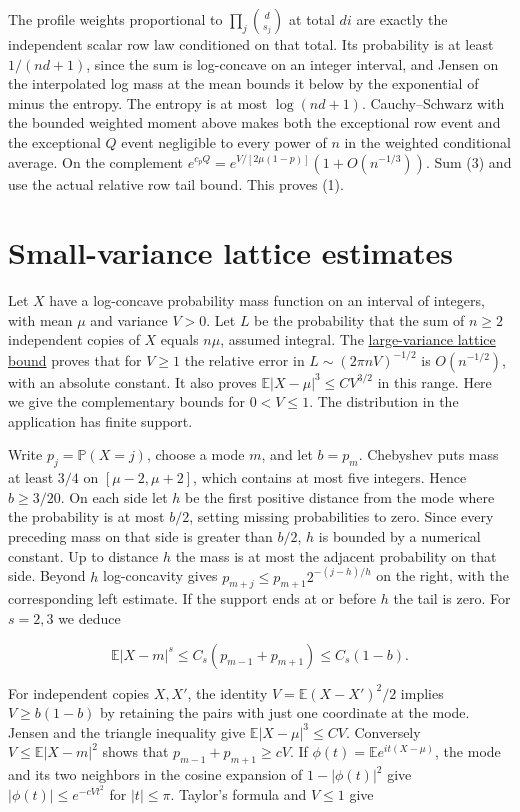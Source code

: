 \documentclass[11pt]{article}
\begin{document}
The profile weights proportional to $\prod_j\binom d{s_j}$ at total
$di$ are exactly the independent scalar row law conditioned on that
total. Its probability is at least $1/(nd+1)$, since the sum is
log-concave on an integer interval, and Jensen on the interpolated
log mass at the mean bounds it below by the exponential of minus
the entropy. The entropy is at most $\log(nd+1)$. Cauchy--Schwarz with
the bounded weighted moment above makes both the exceptional row
event and the exceptional $Q$ event negligible to every power of
$n$ in the weighted conditional average. On the complement
$e^{c_p Q}=e^{V/[2\mu(1-p)]}(1+O(n^{-1/3}))$. Sum (3) and use
the actual relative row tail bound. This proves (1).

\section{Small-variance lattice estimates}
\label{app:small-var}

Let $X$ have a log-concave probability mass function on an interval of integers, with mean $\mu$ and variance $V>0$. Let $L$ be the probability that the sum of $n\ge2$ independent copies of $X$ equals $n\mu$, assumed integral. The \hyperref[app:large-var]{large-variance lattice bound} proves that for $V\ge1$ the relative error in $L\sim(2\pi nV)^{-1/2}$ is $O(n^{-1/2})$, with an absolute constant. It also proves $\mathbb E|X-\mu|^3\le C V^{3/2}$ in this range. Here we give the complementary bounds for $0<V\le1$. The distribution in the application has finite support.

Write $p_j=\mathbb P(X=j)$, choose a mode $m$, and let $b=p_m$. Chebyshev puts mass at least $3/4$ on $[\mu-2,\mu+2]$, which contains at most five integers. Hence $b\ge3/20$. On each side let $h$ be the first positive distance from the mode where the probability is at most $b/2$, setting missing probabilities to zero. Since every preceding mass on that side is greater than $b/2$, $h$ is bounded by a numerical constant. Up to distance $h$ the mass is at most the adjacent probability on that side. Beyond $h$ log-concavity gives $p_{m+j}\le p_{m+1}2^{-(j-h)/h}$ on the right, with the corresponding left estimate. If the support ends at or before $h$ the tail is zero. For $s=2,3$ we deduce

\[
\mathbb E|X-m|^s\le C_s(p_{m-1}+p_{m+1})\le C_s(1-b).
\]

For independent copies $X,X'$, the identity $V=\mathbb E(X-X')^2/2$ implies $V\ge b(1-b)$ by retaining the pairs with just one coordinate at the mode. Jensen and the triangle inequality give $\mathbb E|X-\mu|^3\le C V$. Conversely $V\le\mathbb E|X-m|^2$ shows that $p_{m-1}+p_{m+1}\ge cV$. If $\phi(t)=\mathbb E e^{it(X-\mu)}$, the mode and its two neighbors in the cosine expansion of $1-|\phi(t)|^2$ give $|\phi(t)|\le e^{-c Vt^2}$ for $|t|\le\pi$. Taylor's formula and $V\le1$ give
\end{document}
